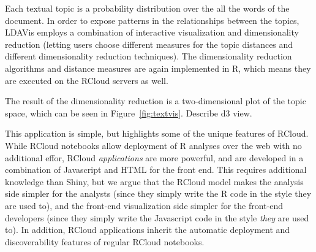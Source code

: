 Each textual topic is a probability distribution over the all the
words of the document. In order to expose patterns in the
relationships between the topics, LDAVis employs a combination of
interactive visualization and dimensionality reduction (letting users
choose different measures for the topic distances and different
dimensionality reduction techniques). The dimensionality reduction
algorithms and distance measures are again implemented in R, which
means they are executed on the RCloud servers as well.

The result of the dimensionality reduction is a two-dimensional plot
of the topic space, which can be seen in
Figure~\ref{fig:textvis}. Describe d3 view.

This application is simple, but highlights some of the unique features
of RCloud. While RCloud notebooks allow deployment of R analyses over
the web with no additional effor, RCloud \emph{applications} are more
powerful, and are developed in a combination of Javascript and HTML
for the front end. This requires additional knowledge than Shiny, but
we argue that the RCloud model makes the analysis side simpler for the
analysts (since they simply write the R code in the style they are
used to), and the front-end visualization side simpler for the
front-end developers (since they simply write the Javascript code in
the style \emph{they} are used to). In addition, RCloud applications
inherit the automatic deployment and discoverability features of
regular RCloud notebooks.




